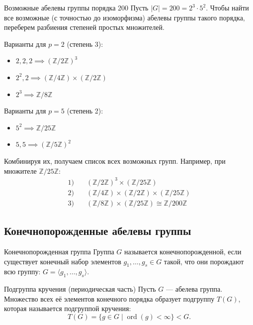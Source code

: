 \begin{Example}{Возможные абелевы группы порядка 200}{}
	Пусть $|G| = 200 = 2^3 \cdot 5^2$. Чтобы найти все возможные (с точностью до изоморфизма) абелевы группы такого порядка, переберем разбиения степеней простых множителей.
	
	Варианты для $p=2$ (степень 3):
	\begin{itemize}
		\item $2, 2, 2 \implies (\mathbb{Z}/2\mathbb{Z})^3$
		\item $2^2, 2 \implies (\mathbb{Z}/4\mathbb{Z}) \times (\mathbb{Z}/2\mathbb{Z})$
		\item $2^3 \implies \mathbb{Z}/8\mathbb{Z}$
	\end{itemize}
	
	Варианты для $p=5$ (степень 2):
	\begin{itemize}
		\item $5^2 \implies \mathbb{Z}/25\mathbb{Z}$
		\item $5, 5 \implies (\mathbb{Z}/5\mathbb{Z})^2$
	\end{itemize}
	
	Комбинируя их, получаем список всех возможных групп. Например, при множителе $\mathbb{Z}/25\mathbb{Z}$:
	\begin{align*}
		1) \quad & (\mathbb{Z}/2\mathbb{Z})^3 \times (\mathbb{Z}/25\mathbb{Z}) \\
		2) \quad & (\mathbb{Z}/4\mathbb{Z}) \times (\mathbb{Z}/2\mathbb{Z}) \times (\mathbb{Z}/25\mathbb{Z}) \\
		3) \quad & (\mathbb{Z}/8\mathbb{Z}) \times (\mathbb{Z}/25\mathbb{Z}) \cong \mathbb{Z}/200\mathbb{Z}
	\end{align*}
\end{Example}

\subsection{Конечнопорожденные абелевы группы}

\begin{Definition}{Конечнопорожденная группа}{}
	Группа $G$ называется конечнопорожденной, если существует конечный набор элементов $g_1, \dots, g_s \in G$ такой, что они порождают всю группу: $G = \langle g_1, \dots, g_s \rangle$.
\end{Definition}

\begin{Definition}{Подгруппа кручения (периодическая часть)}{}
	Пусть $G$ --- абелева группа. Множество всех её элементов конечного порядка образует подгруппу $T(G)$, которая называется подгруппой кручения:
	\[
	T(G) = \{ g \in G \mid \operatorname{ord}(g) < \infty \} < G.
	\]
\end{Definition}

